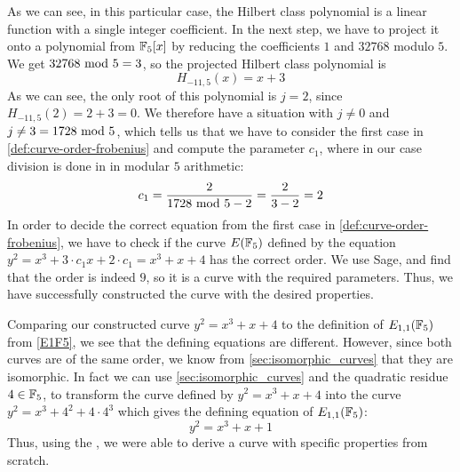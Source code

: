 \begin{example}
As we can see, in this particular case, the Hilbert class polynomial is a linear function with a single integer coefficient. In the next step, we have to project it onto a polynomial from $\mathbb{F}_5[x]$ by reducing the coefficients $1$ and $32768$ modulo $5$. We get $32768 \text{ mod } 5=3$, so the projected Hilbert class polynomial is
$$
H_{-11,5}(x)=x+3
$$ 
As we can see, the only root of this polynomial is $j=2$, since $H_{-11,5}(2)=2+3=0$. We therefore have a situation with $j\neq 0$ and $j\neq 3 = 1728 \text{ mod } 5$, which tells us that we have to consider the first case in \ref{def:curve-order-frobenius} and compute the parameter $c_1$, where in our case division is done in in modular $5$ arithmetic:
\begin{equation}
c_1 = \frac{2}{1728 \text{ mod } 5-2} = \frac{2}{3-2}= 2
\end{equation}
In order to decide the correct equation from the first case in \ref{def:curve-order-frobenius}, we have to check if the curve $E(\mathbb{F}_5)$ defined by the  equation  $y^2 =  x^3 + 3\cdot c_1 x + 2\cdot c_1 = x^3 + x + 4$ has the correct order. We use Sage, and find that the order is indeed $9$, so it is a curve with the required parameters. Thus, we have successfully constructed the curve with the desired properties.

Comparing our constructed curve $y^2 =  x^3 + x + 4$ to the definition of $E_{1,1}(\mathbb{F}_5)$ from \examplename{} \ref{E1F5}, we see that the defining equations are different. However, since both curves are of the same order, we know from \ref{sec:isomorphic_curves} that they are isomorphic. In fact we can use \ref{sec:isomorphic_curves} and the quadratic residue $4\in \mathbb{F}_5$, to transform the curve defined by $y^2 = x^3 +x+4$ into the curve $y^2 = x^3 + 4^2 + 4\cdot 4^3$ which gives the defining equation of $E_{1,1}(\mathbb{F}_5)$:
$$
y^2 = x^3 + x +1
$$
Thus, using the , we were able to derive a curve with specific properties from scratch.
\end{example}

